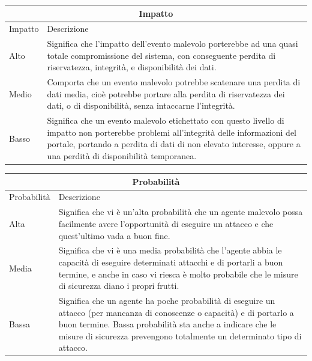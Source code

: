 \documentclass{article}
\begin{document}
\begin{center}
\begin{tabular}[t]{|p{1.5cm}|p{10cm}|}
\hline
\multicolumn{2}{|c|}{\bf Impatto} \\
\hline
Impatto & Descrizione \\
\hline
\hline
Alto & Significa che l'impatto dell'evento malevolo porterebbe ad una quasi totale compromissione del sistema, con conseguente perdita di riservatezza, integrità, e disponibilità dei dati. \\
\hline
Medio & Comporta che un evento malevolo potrebbe scatenare una perdita di dati media, cioè potrebbe portare alla perdita di riservatezza dei dati, o di disponibilità, senza intaccarne l'integrità.  \\
\hline
Basso   & Significa che un evento malevolo etichettato con questo livello di impatto non porterebbe problemi all'integrità delle informazioni del portale, portando a perdita di dati di non elevato interesse, oppure a una perdità di disponibilità temporanea. \\
\hline
\end{tabular}

%
\vspace{5mm}
%
\noindent %
\begin{tabular}[t]{|p{1.5cm}|p{10cm}|}
\hline
\multicolumn{2}{|c|}{\bf Probabilità} \\
\hline
Probabilità & Descrizione \\
\hline
\hline
Alta   & Significa che vi è un'alta probabilità che un agente malevolo possa facilmente avere l'opportunità di eseguire un attacco e che quest'ultimo vada a buon fine. \\
\hline
Media & Significa che vi è una media probabilità che l'agente abbia le capacità di eseguire determinati attacchi e di portarli a buon termine, e anche in caso vi riesca è molto probabile che le misure di sicurezza diano i propri frutti. \\
\hline
Bassa   & Significa che un agente ha poche probabilità di eseguire un attacco (per mancanza di conoscenze o capacità) e di portarlo a buon termine. Bassa probabilità sta anche a indicare che le misure di sicurezza prevengono totalmente un determinato tipo di attacco. \\
\hline
\end{tabular}
\end{center}

\vspace{5mm}
\end{document}

